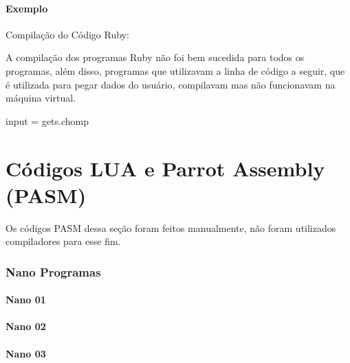 \documentclass[12pt,a4paper,twoside]{report}
\begin{document}
\subsubsection{Exemplo}

Compilação do Código Ruby:


A compilação dos programas Ruby não foi bem sucedida para todos os programas, além disso, programas que utilizavam a linha de código a seguir, que é utilizada para pegar dados do usuário, compilavam mas não funcionavam na máquina virtual.
\begin{terminal}
input = gets.chomp
\end{terminal}


\chapter{Códigos LUA e Parrot Assembly (PASM)}

Os códigos PASM dessa seção foram feitos manualmente, não foram utilizados compiladores para esse fim.

\subsection{Nano Programas}
\subsubsection{Nano 01}



\subsubsection{Nano 02}



\subsubsection{Nano 03}


\end{document}

